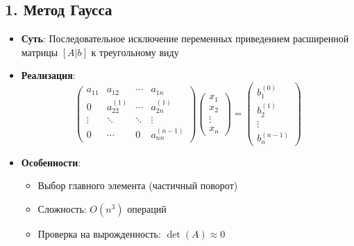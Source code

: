 \documentclass[12pt, a4paper]{article}
\begin{document}
\subsection*{1. Метод Гаусса}
\begin{itemize}
\item \textbf{Суть}: Последовательное исключение переменных приведением расширенной матрицы $[A|b]$ к треугольному виду
\item \textbf{Реализация}:
\begin{equation*}
\begin{pmatrix}
a_{11} & a_{12} & \cdots & a_{1n} \\
0 & a_{22}^{(1)} & \cdots & a_{2n}^{(1)} \\
\vdots & \ddots & \ddots & \vdots \\
0 & \cdots & 0 & a_{nn}^{(n-1)}
\end{pmatrix}
\begin{pmatrix}
x_1 \\ x_2 \\ \vdots \\ x_n
\end{pmatrix} = 
\begin{pmatrix}
b_1^{(0)} \\ b_2^{(1)} \\ \vdots \\ b_n^{(n-1)}
\end{pmatrix}
\end{equation*}
\item \textbf{Особенности}:
\begin{itemize}
\item Выбор главного элемента (частичный поворот)
\item Сложность: $O(n^3)$ операций
\item Проверка на вырожденность: $\det(A) \approx 0$
\end{itemize}
\end{itemize}
\end{document}
